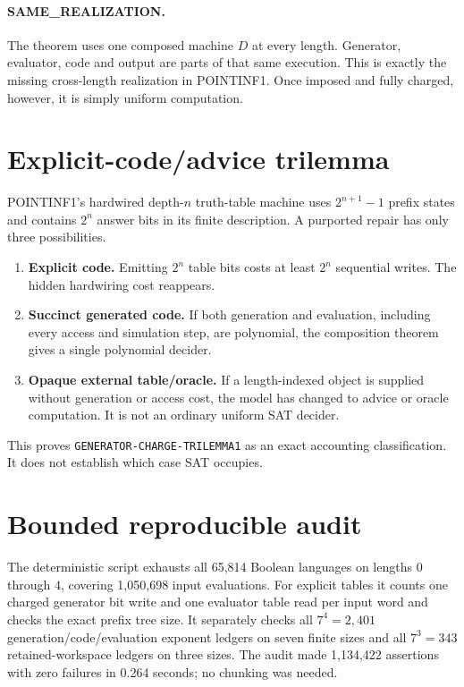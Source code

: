 \documentclass[11pt]{article}
\begin{document}
\paragraph{SAME\_REALIZATION.}
The theorem uses one composed machine \(D\) at every length.  Generator,
evaluator, code and output are parts of that same execution.  This is exactly
the missing cross-length realization in POINTINF1.  Once imposed and fully
charged, however, it is simply uniform computation.

\section{Explicit-code/advice trilemma}

POINTINF1's hardwired depth-\(n\) truth-table machine uses
\(2^{n+1}-1\) prefix states and contains \(2^n\) answer bits in its finite
description.  A purported repair has only three possibilities.
\begin{enumerate}
\item \textbf{Explicit code.}  Emitting \(2^n\) table bits costs at least
\(2^n\) sequential writes.  The hidden hardwiring cost reappears.
\item \textbf{Succinct generated code.}  If both generation and evaluation,
including every access and simulation step, are polynomial, the composition
theorem gives a single polynomial decider.
\item \textbf{Opaque external table/oracle.}  If a length-indexed object is
supplied without generation or access cost, the model has changed to advice
or oracle computation.  It is not an ordinary uniform SAT decider.
\end{enumerate}
This proves \texttt{GENERATOR-CHARGE-TRILEMMA1} as an exact accounting
classification.  It does not establish which case SAT occupies.

\section{Bounded reproducible audit}

The deterministic script
 exhausts all
65,814 Boolean languages on lengths \(0\) through \(4\), covering 1,050,698
input evaluations.  For explicit tables it counts one charged generator bit
write and one evaluator table read per input word and checks the exact prefix
tree size.  It separately checks all \(7^4=2,401\) generation/code/evaluation
exponent ledgers on seven finite sizes and all \(7^3=343\) retained-workspace
ledgers on three sizes.  The audit made 1,134,422 assertions with zero
failures in 0.264 seconds; no chunking was needed.
\end{document}
